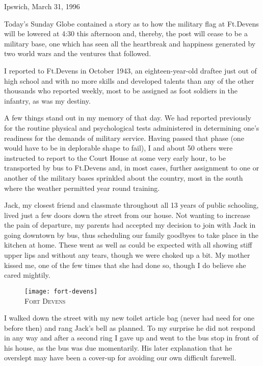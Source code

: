\documentclass[../m3y]{subfiles}
\begin{document}
\vspace*{-30pt}
\begin{center}\large Ipswich, March 31, 1996\end{center}
Today's Sunday Globe contained a story as to how the military flag at Ft.\@ Devens will be lowered at 4:30 this afternoon and, thereby, the post will cease to be a military base, one which has seen all the heartbreak and happiness generated by two world wars and the ventures that followed.

I reported to Ft.\@ Devens in October 1943, an eighteen-year-old draftee just out of high school and with no more skills and developed talents than any of the other thousands who reported weekly, most to be assigned as foot soldiers in the infantry, as was my destiny.

A few things stand out in my memory of that day. We had reported previously for the routine physical and psychological tests administered in determining one's readiness for the demands of military service. Having passed that phase (one would have to be in deplorable shape to fail), I and about 50 others were instructed to report to the Court House at some very early hour, to be transported by bus to Ft.\@ Devens and, in most cases, further assignment to one or another of the military bases sprinkled about the country, most in the south where the weather permitted year round training.

Jack, my closest friend and classmate throughout all 13 years of public schooling, lived just a few doors down the street from our house. Not wanting to increase the pain of departure, my parents had accepted my decision to join with Jack in going downtown by bus, thus scheduling our family goodbyes to take place in the kitchen at home. These went as well as could be expected with all showing stiff upper lips and without any tears, though we were choked up a bit. My mother kissed me, one of the few times that she had done so, though I do believe she cared mightily.

\begin{figure}[t]
\centering
\texttt{[image: fort-devens]}\\
\medskip
{\newtimes\textsc{Fort Devens}}
\end{figure}

I walked down the street with my new toilet article bag (never had need for one before then) and rang Jack's bell as planned. To my surprise he did not respond in any way and after a second ring I gave up and went to the bus stop in front of his house, as the bus was due momentarily. His later explanation that he overslept may have been a cover-up for avoiding our own difficult farewell.
\end{document}
